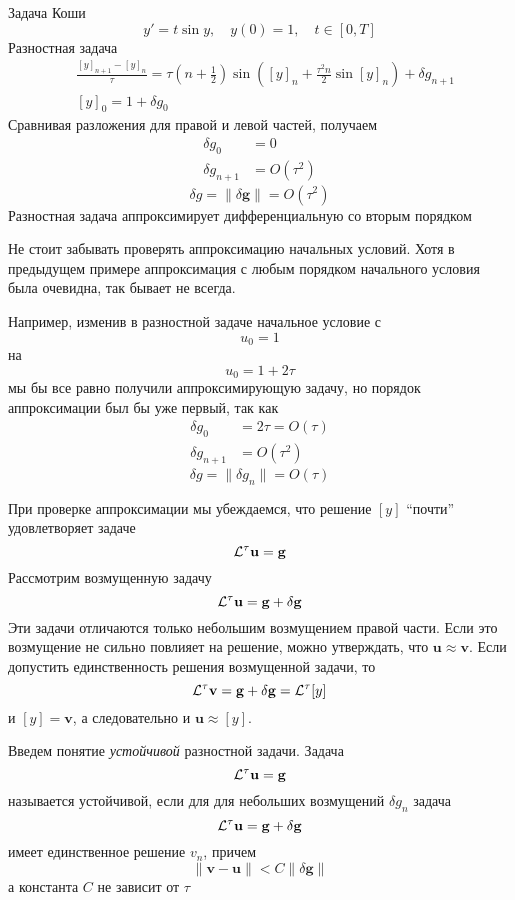 \documentclass[professionalfonts,compress,unicode]{beamer}
\begin{document}
{
	Задача Коши
	$$
	y' = t \sin y, \quad y(0) = 1, \quad t \in [0, T]
	$$
	Разностная задача
	\begin{align*}
	&\frac{[y]_{n+1} - [y]_n}{\tau} = \tau\left(n+\frac{1}{2}\right)\sin\left([y]_n + \frac{\tau^2 n}{2} 
		\sin [y]_n\right) + \delta g_{n+1}\\
	&[y]_0 = 1 + \delta g_0
	\end{align*}
	Сравнивая разложения для правой и левой частей, получаем
	\begin{align*}
	\delta g_0 &= 0\\
	\delta g_{n+1} &= O(\tau^2)
	\end{align*}
	$$
	\delta g = \|\delta \mathbf{g}\| = O(\tau^2)
	$$
	Разностная задача аппроксимирует дифференциальную со вторым порядком
}

{
	Не стоит забывать проверять аппроксимацию начальных условий. Хотя в предыдущем примере 
	аппроксимация с любым порядком начального условия была очевидна, так бывает не всегда.
	
	Например, изменив в разностной задаче начальное условие с 
	$$
	u_0 = 1
	$$
	на 
	$$
	u_0 = 1+2\tau
	$$
	мы бы все равно получили аппроксимирующую задачу, но порядок аппроксимации был бы уже первый, так как
	\begin{align*}
	\delta g_0 &= 2\tau = O(\tau)\\
	\delta g_{n+1} &= O(\tau^2)
	\end{align*}
	$$
	\delta g = \|\delta g_n\| = O(\tau)
	$$	
}

{
	При проверке аппроксимации мы убеждаемся, что решение $[y]$ ``почти'' удовлетворяет задаче
	$$
	{\mathcal{L}^{\tau}} \mathbf{u} = \mathbf{g}
	$$
	Рассмотрим возмущенную задачу
	$$
	{\mathcal{L}^{\tau}} \mathbf{u} = \mathbf{g} + \delta \mathbf{g}
	$$
	Эти задачи отличаются только небольшим возмущением правой части. Если это возмущение не сильно повлияет
	на решение, можно утверждать, что $\mathbf{u} \approx \mathbf{v}$. Если допустить единственность 
	решения возмущенной задачи, то
	$$
	{\mathcal{L}^{\tau}} \mathbf{v} = \mathbf{g} + \delta \mathbf{g} = {\mathcal{L}^{\tau}} [y]
	$$
	и $[y] = \mathbf{v}$, а следовательно и $\mathbf{u} \approx [y]$.
}

{
	Введем понятие \emph{устойчивой} разностной задачи. Задача 
	$$
	{\mathcal{L}^{\tau}} \mathbf{u} = \mathbf{g}
	$$
	называется устойчивой, если для для небольших возмущений $\delta g_n$ задача
	$$
	{\mathcal{L}^{\tau}} \mathbf{u} = \mathbf{g} + \delta \mathbf{g}
	$$
	имеет единственное решение $v_n$, причем
	$$
	\|\mathbf{v} - \mathbf{u}\| < C \|\delta \mathbf{g}\|
	$$
	а константа $C$ не зависит от $\tau$
}
\end{document}
